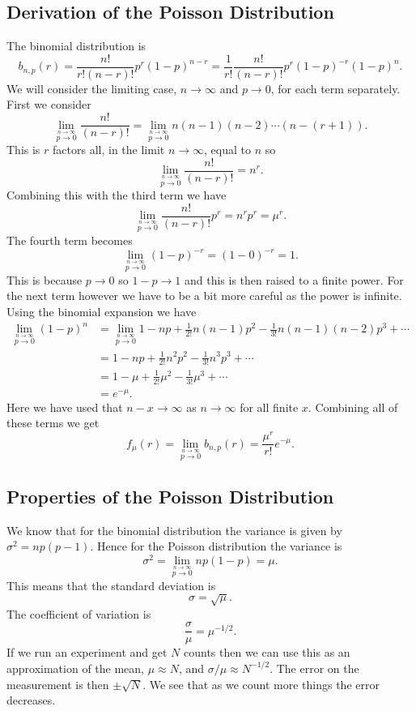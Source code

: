 \documentclass[a4paper]{article}
\begin{document}
    \subsection{Derivation of the Poisson Distribution}
    The binomial distribution is
    \[b_{n,p}(r) = \frac{n!}{r!(n-r)!}p^r(1 - p)^{n-r} = \frac{1}{r!}\frac{n!}{(n-r)!}p^r(1 - p)^{-r}(1-p)^n.\]
    We will consider the limiting case, \(n\to\infty\) and \(p\to 0\), for each term separately.
    First we consider
    \[\lim_{\stackrel{n\to\infty}{p\to 0}} \frac{n!}{(n-r)!} =  \lim_{\stackrel{n\to\infty}{p\to 0}} n(n-1)(n-2)\dotsm(n-(r+1)).\]
    This is \(r\) factors all, in the limit \(n\to\infty\), equal to \(n\) so
    \[\lim_{\stackrel{n\to\infty}{p\to 0}} \frac{n!}{(n-r)!} = n^r.\]
    Combining this with the third term we have
    \[\lim_{\stackrel{n\to\infty}{p\to 0}} \frac{n!}{(n-r)!}p^r = n^rp^r = \mu^r.\]
    The fourth term becomes
    \[\lim_{\stackrel{n\to\infty}{p\to 0}} (1-p)^{-r} = (1-0)^{-r} = 1.\]
    This is because \(p\to 0\) so \(1-p\to 1\) and this is then raised to a finite power.
    For the next term however we have to be a bit more careful as the power is infinite.
    Using the binomial expansion we have
    \begin{align*}
        \lim_{\stackrel{n\to\infty}{p\to 0}} (1 - p)^n &= \lim_{\stackrel{n\to\infty}{p\to 0}} 1 - np + \frac{1}{2!}n(n - 1)p^2 - \frac{1}{3!}n(n-1)(n-2)p^3 + \dotsb\\
        &=  1 - np + \frac{1}{2!}n^2p^2 - \frac{1}{3!}n^3p^3 + \dotsb\\
        &= 1 - \mu + \frac{1}{2!}\mu^2 - \frac{1}{3!}\mu^3 + \dotsb\\
        &= e^{-\mu}.
    \end{align*}
    Here we have used that \(n - x\to\infty\) as \(n\to\infty\) for all finite \(x\).
    Combining all of these terms we get
    \[f_{\mu}(r) = \lim_{\stackrel{n\to\infty}{p\to 0}} b_{n,p}(r) = \frac{\mu^r}{r!}e^{-\mu}.\]
    
    \subsection{Properties of the Poisson Distribution}
    We know that for the binomial distribution the variance is given by \(\sigma^2 = np(p-1)\).
    Hence for the Poisson distribution the variance is
    \[\sigma^2 = \lim_{\stackrel{n\to\infty}{p\to 0}} np(1-p) = \mu.\]
    This means that the standard deviation is
    \[\sigma = \sqrt{\mu}.\]
    The coefficient of variation is
    \[\frac{\sigma}{\mu} = \mu^{-1/2}.\]
    If we run an experiment and get \(N\) counts then we can use this as an approximation of the mean, \(\mu \approx N\), and \(\sigma/\mu \approx N^{-1/2}\).
    The error on the measurement is then \(\pm\sqrt{N}\).
    We see that as we count more things the error decreases.
    
\end{document}
